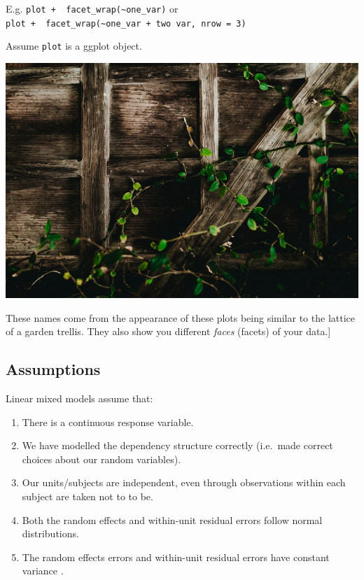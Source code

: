 \documentclass[
  openany]{book}
\providecommand{\tightlist}{%
  \setlength{\itemsep}{0pt}\setlength{\parskip}{0pt}}
\begin{document}
E.g. \texttt{plot\ +\ \ facet\_wrap(\textasciitilde{}one\_var)} or
\texttt{plot\ +\ \ facet\_wrap(\textasciitilde{}one\_var\ +\ two\ var,\ nrow\ =\ 3)}

Assume \texttt{plot} is a ggplot object.

\begin{center}\includegraphics[width=1\linewidth]{images/m3/trellis} \end{center}

These names come from the appearance of these plots being similar to the lattice of a garden trellis. They also show you different \emph{faces} (facets) of your data.{]}

\hypertarget{assumptions-3}{%
\subsection{Assumptions}\label{assumptions-3}}

Linear mixed models assume that:

\begin{enumerate}
\def\labelenumi{\arabic{enumi}.}
\tightlist
\item
  There is a continuous response variable.
\item
  We have modelled the dependency structure correctly (i.e.~made correct choices about our random variables).
\item
  Our units/subjects are independent, even through observations within each subject are taken not to to be.
\item
  Both the random effects and within-unit residual errors follow normal distributions.
\item
  The random effects errors and within-unit residual errors have constant variance .
\end{enumerate}
\end{document}
